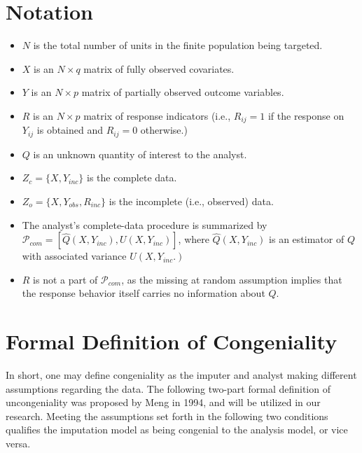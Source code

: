 \documentclass[
  letterpaper,
  DIV=11,
  numbers=noendperiod]{scrreprt}
\providecommand{\tightlist}{%
  \setlength{\itemsep}{0pt}\setlength{\parskip}{0pt}}\usepackage{longtable,booktabs,array}
\begin{document}
\hypertarget{notation}{%
\section*{Notation}\label{notation}}

\begin{itemize}
\tightlist
\item
  \(N\) is the total number of units in the finite population being
  targeted.\\
\item
  \(X\) is an \(N \times q\) matrix of fully observed covariates.\\
\item
  \(Y\) is an \(N \times p\) matrix of partially observed outcome
  variables.\\
\item
  \(R\) is an \(N \times p\) matrix of response indicators (i.e.,
  \(R_{ij} = 1\) if the response on \(Y_{ij}\) is obtained and
  \(R_{ij} = 0\) otherwise.)\\
\item
  \(Q\) is an unknown quantity of interest to the analyst.
\item
  \(Z_c = \{X, Y_{inc}\}\) is the complete data.
\item
  \(Z_o = \{X, Y_{obs}, R_{inc}\}\) is the incomplete (i.e., observed)
  data.
\item
  The analyst's complete-data procedure is summarized by
  \(\mathscr{P}_{com} = [\hat{Q}(X, Y_{inc}), U(X, Y_{inc})]\), where
  \(\hat{Q}(X, Y_{inc})\) is an estimator of \(Q\) with associated
  variance \(U(X, Y_{inc}.)\)
\item
  \(R\) is not a part of \(\mathscr{P}_{com}\), as the missing at random
  assumption implies that the response behavior itself carries no
  information about \(Q\).
\end{itemize}

\hypertarget{formal-definition-of-congeniality}{%
\section*{Formal Definition of
Congeniality}\label{formal-definition-of-congeniality}}

In short, one may define congeniality as the imputer and analyst making
different assumptions regarding the data. The following two-part formal
definition of uncongeniality was proposed by Meng in 1994, and will be
utilized in our research. Meeting the assumptions set forth in the
following two conditions qualifies the imputation model as being
congenial to the analysis model, or vice versa.
\end{document}
